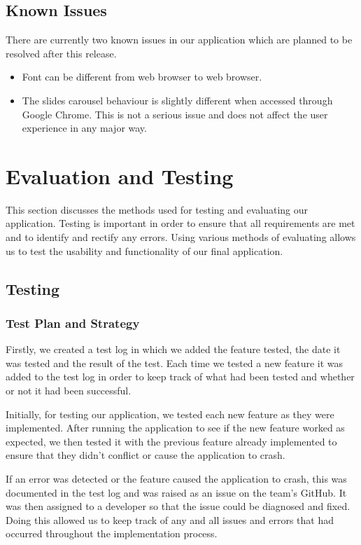 \documentclass{l3proj}
\begin{document}
\section{Known Issues}
There are currently two known issues in our application which are planned to be resolved after this release.\\
\begin{itemize}
\item Font can be different from web browser to web browser.
\item The slides carousel behaviour is slightly different when accessed through Google Chrome. This is not a serious issue and does not affect the user experience in any major way.
\end{itemize}

\chapter{Evaluation and Testing}
\label{evaluation}

This section discusses the methods used for testing and evaluating our application. Testing is important in order to ensure that all requirements are met and to identify and rectify any errors. Using various methods of evaluating allows us to test the usability and functionality of our final application.

\section{Testing}

\subsection{Test Plan and Strategy}

Firstly, we created a test log in which we added the feature tested, the date it was tested and the result of the test. Each time we tested a new feature it was added to the test log in order to keep track of what had been tested and whether or not it had been successful.

Initially, for testing our application, we tested each new feature as they were implemented. After running the application to see if the new feature worked as expected, we then tested it with the previous feature already implemented to ensure that they didn't conflict or cause the application to crash.

If an error was detected or the feature caused the application to crash, this was documented in the test log and was raised as an issue on the team's GitHub. It was then assigned to a developer so that the issue could be diagnosed and fixed. Doing this allowed us to keep track of any and all issues and errors that had occurred throughout the implementation process.
\end{document}
